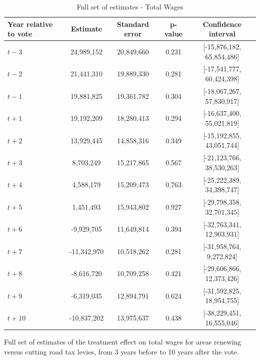 \begin{table}[htbp]
    \centering
    \caption{Full set of estimates - Total Wages}
    \label{tab:total_wages}
    \begin{tabular}{p{2cm}cccc}
        \hline
        Year relative to vote & Estimate & Standard error & p-value & Confidence interval \\
        \hline
        $t - 3$  & 24,989,152   & 20,849,660   & 0.231  & [-15,876,182, 65,854,486] \\
        $t - 2$  & 21,441,310   & 19,889,330   & 0.281  & [-17,541,777, 60,424,398] \\
        $t - 1$  & 19,881,825   & 19,361,782   & 0.304  & [-18,067,267, 57,830,917] \\
        $t + 1$ & 19,192,209   & 18,280,413   & 0.294  & [-16,637,400, 55,021,819] \\
        $t + 2$ & 13,929,445   & 14,858,316   & 0.349  & [-15,192,855, 43,051,744] \\
        $t + 3$ & 8,703,249    & 15,217,865   & 0.567  & [-21,123,766, 38,530,263] \\
        $t + 4$ & 4,588,179    & 15,209,473   & 0.763  & [-25,222,389, 34,398,747] \\
        $t + 5$ & 1,451,493    & 15,943,802   & 0.927  & [-29,798,358, 32,701,345] \\
        $t + 6$ & -9,929,705   & 11,649,814   & 0.394  & [-32,763,341, 12,903,931] \\
        $t + 7$ & -11,342,970  & 10,518,262   & 0.281  & [-31,958,764, 9,272,824] \\
        $t + 8$ & -8,616,720   & 10,709,258   & 0.421  & [-29,606,866, 12,373,426] \\
        $t + 9$ & -6,319,035   & 12,894,791   & 0.624  & [-31,592,825, 18,954,755] \\
        $t + 10$ & -10,837,202 & 13,975,637   & 0.438  & [-38,229,451, 16,555,046] \\
        \hline
    \end{tabular}
    \begin{tablenotes}
        \small
        \item Full set of estimates of the treatment effect on total wages for areas renewing versus cutting road tax levies, from 3 years before to 10 years after the vote.
    \end{tablenotes}
\end{table}

